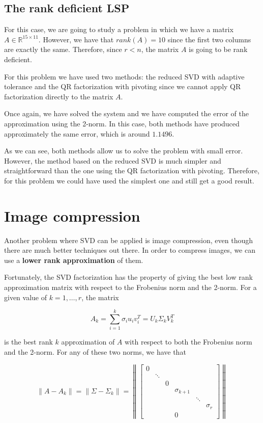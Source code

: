\documentclass[11pt,a4paper]{article}
\begin{document}
\subsection{The rank deficient LSP}

For this case, we are going to study a problem in which we have a matrix $A \in \mathbb{R}^{15 \times 11}$.
However, we have that $rank(A) = 10$ since the first two columns are exactly the same. Therefore, since
$r < n$, the matrix $A$ is going to be rank deficient.

For this problem we have used two methods: the reduced SVD with adaptive tolerance and the QR
factorization with pivoting since we cannot apply QR factorization directly to the matrix $A$.

Once again, we have solved the system and we have computed the error of the approximation using the
2-norm. In this case, both methods have produced approximately the same error, which is around $1.1496$.

As we can see, both methods allow us to solve the problem with small error. However, the method
based on the reduced SVD is much simpler and straightforward than the one using the QR factorization
with pivoting. Therefore, for this problem we could have used the simplest one and still get a good
result.

\section{Image compression}

Another problem where SVD can be applied is image compression, even though there are much better
techniques out there. In order to compress images, we can use a \textbf{lower rank approximation} of
them.

Fortunately, the SVD factorization has the property of giving the best low rank approximation matrix
with respect to the Frobenius norm and the 2-norm. For a given value of $k = 1, \dots, r$, the matrix

\[
  A_k = \sum_{i=1}^k \sigma_i u_i v_i^T = U_k \Sigma_k V_k^T
\]

is the best rank $k$ approximation of $A$ with respect to both the Frobenius norm and the 2-norm.
For any of these two norms, we have that

\begin{equation}
  \label{eq:low-rank-approximation}
  \left\lVert A - A_k \right\rVert =
  \left\lVert \Sigma - \Sigma_k \right\rVert =
  \left\lVert
    \begin{bmatrix}
      0 & & & & & \\
      & \ddots & & & & \\
      & & 0 & & & \\
      & & & \sigma_{k+1} & & \\
      & & & & \ddots & \\
      & & & & & \sigma_r \\
      & & & 0 & &
    \end{bmatrix}
  \right\rVert
\end{equation}
\end{document}
